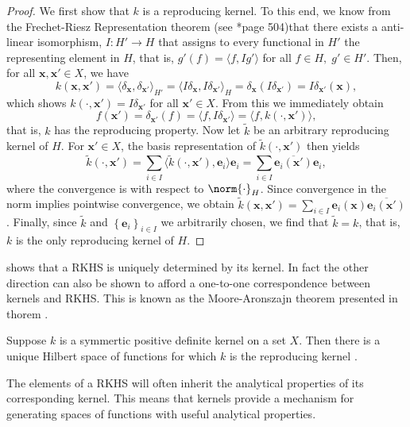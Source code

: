 \begin{proof}
    We first show that $k$ is a reproducing kernel. To this end, we know from the Frechet-Riesz Representation theorem (see \cite{SteinwartIngo2008SVMb}*{page 504})that there exists a anti-linear isomorphism, $I : H' \to H$ that assigns to every functional in $H'$ the representing element in $H$, that is, $g'(f) = \langle f , I g' \rangle$ for all $f \in H, \; g' \in H'$. Then, for all $\bm{x} , \bm{x}' \in X$, we have
    \begin{equation*}
        k \left( \bm{x} , \bm{x}' \right) = \langle \delta_{\bm{x}} , \delta_{\bm{x}'} \rangle_{H'} = \langle I \delta_{\bm{x}} , I \delta_{\bm{x}'} \rangle_{H} = \delta_{\bm{x}} \left( I \delta_{\bm{x}'} \right) = I \delta_{\bm{x}'} (\bm{x}),
    \end{equation*}
    which shows $k \left( \cdot , \bm{x}' \right) = I \delta_{\bm{x}'}$ for all $\bm{x}' \in X$. From this we immediately obtain
    \begin{equation*}
        f(\bm{x}') = \delta_{\bm{x}'} (f) = \langle f , I \delta_{\bm{x}'} \rangle = \langle f , k \left( \cdot , \bm{x}' \right) \rangle,
    \end{equation*}
    that is, $k$ has the reproducing property. Now let $\tilde{k}$ be an arbitrary reproducing kernel of $H$. For $\bm{x}' \in X$, the basis representation of $\tilde{k} \left( \cdot , \bm{x}' \right)$ then yields
    \begin{equation*}
        \tilde{k} \left( \cdot , \bm{x}' \right) = \sum_{i \in I} \langle \tilde{k} (\cdot , \bm{x}'), \bm{e}_{i} \rangle \bm{e}_{i} = \sum_{i \in I} \overline{\bm{e}_{i} (\bm{x}')} \bm{e}_{i},
    \end{equation*}
    where the convergence is with respect to $\norm{\cdot}_H$. Since convergence in the norm implies pointwise convergence, we obtain $\tilde{k} \left( \bm{x} , \bm{x}' \right) = \sum_{i \in I} \bm{e}_{i} (\bm{x}) \overline{\bm{e}_{i} (\bm{x}')}$. Finally, since $\tilde{k}$ and $\left\{ \bm{e}_{i} \right\}_{i\in I}$ we arbitrarily chosen, we find that $\tilde{k} = k$, that is, $k$ is the only reproducing kernel of $H$.
\end{proof}

 shows that a RKHS is uniquely determined by its kernel. In fact the other direction can also be shown to afford a one-to-one correspondence between kernels and RKHS. This is known as the Moore-Aronszajn theorem presented in thorem .

\begin{thm} \label{theorem: Moore-Aronszajn}
    Suppose $k$ is a symmertic positive definite kernel on a set $X$. Then there is a unique Hilbert space of functions for which $k$ is the reproducing kernel \cite{BerlinetAlain2003RKHS}.
\end{thm}

The elements of a RKHS will often inherit the analytical properties of its corresponding kernel. This means that kernels provide a mechanism for generating spaces of functions with useful analytical properties.